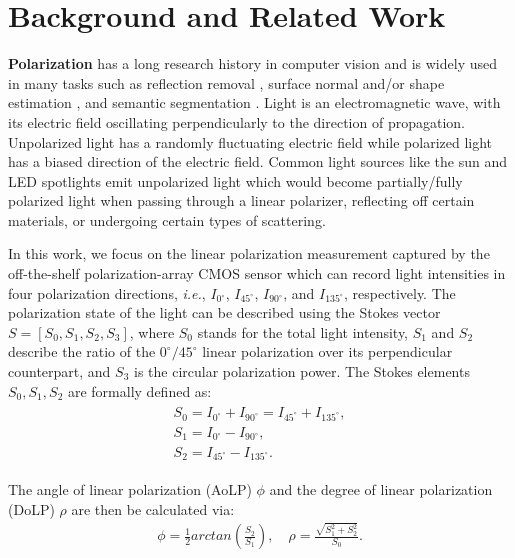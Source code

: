 \section{Background and Related Work}
\label{sec:related_work}

\textbf{Polarization} has a long research history in computer vision and is widely used in many tasks such as reflection removal \cite{wieschollek2018separating, lei2020polarized, li2020reflection}, surface normal and/or shape estimation \cite{chen2017multi, kadambi2015polarized}, and semantic segmentation \cite{mei2022glass, kalra2020deep}. Light is an electromagnetic wave, with its electric field oscillating perpendicularly to the direction of propagation. Unpolarized light has a randomly fluctuating electric field while polarized light has a biased direction of the electric field. Common light sources like the sun and LED spotlights emit unpolarized light which would become partially/fully polarized light when passing through a linear polarizer, reflecting off certain materials, or undergoing certain types of scattering.

In this work, we focus on the linear polarization measurement captured by the off-the-shelf polarization-array CMOS sensor which can record light intensities in four polarization directions, \textit{i.e.}, $I_{0^{\circ}}$, $I_{45^{\circ}}$, $I_{90^{\circ}}$, and $I_{135^{\circ}}$, respectively. The polarization state of the light can be described using the Stokes vector $S=[S_0, S_1, S_2, S_3]$, where $S_0$ stands for the total light intensity, $S_1$ and $S_2$ describe the ratio of the $0^{\circ}/45^{\circ}$ linear polarization over its perpendicular counterpart, and $S_3$ is the circular polarization power. The Stokes elements $S_0, S_1, S_2$ are formally defined as:
\begin{align} 
\label{eq:stokes}
\begin{array}{lr}
    S_0 =I_{0^{\circ}} + I_{90^{\circ}} = I_{45^{\circ}} + I_{135^{\circ}},\\
    S_1 =I_{0^{\circ}}-I_{90^{\circ}},\\
    S_2 =I_{45^{\circ}}-I_{135^{\circ}}.
\end{array}
\end{align}

The angle of linear polarization (AoLP) $\phi$ and the degree of linear polarization (DoLP) $\rho$ are then be calculated via:
\begin{align} 
\label{eq:polar}
    \phi = \frac{1}{2}arctan(\frac{S_2}{S_1}), \quad \rho = \frac{\sqrt{S_1^2+S_2^2}}{S_0}.
\end{align}

